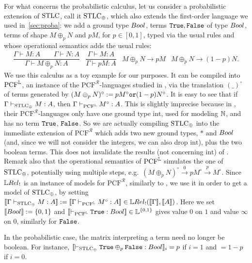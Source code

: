 For what concerns the probabilistic calculus, let us consider a probabilistic extension of $\mathrm{STLC}$, call it $\mathrm{STLC}_\oplus$, which also extends the first-order language we used in~\autoref{sec:proba}:
we add a ground type $\bool$, terms $\mathtt{True},\mathtt{False}$ of type $\bool$, terms of shape $M\oplus_p N$ and $pM$, for $p\in[0,1]$, typed via the usual rules and whose operational semantics adds the usual rules:
{\small{\[\begin{array}{cccc}
           \dfrac{\Gamma\vdash M:A \qquad \Gamma\vdash N:A}{\Gamma\vdash M\oplus_p N:A}
           &
           \dfrac{\Gamma\vdash M:A}{\Gamma\vdash pM:A}
           &
           M\oplus_p N \to pM
           &
           M\oplus_p N \to (1-p)N.
          \end{array}\]}}
We use this calculus as a toy example for our purposes.
It can be compiled into $\mathrm{PCF}^{\mathbb{L}}$, an instance of the $\mathrm{PCF}^{\mathcal R}$-languages studied in \cite{Manzo2013}, via the translation $(\_)^\circ$ of terms generated by $(M\oplus_p N)^\circ:=pM^\circ\mathtt{ or } (1-p)N^\circ$.
It is easy to see that if $\Gamma \vdash_{\mathrm{STLC}_\oplus} M:A$, then $\Gamma \vdash_{\mathrm{PCF}^{\mathbb{L}}} M^\circ:A$.
This is slightly imprecise because in \cite{Manzo2013}, their $\mathrm{PCF}^{\mathcal R}$-languages only have one ground type $\mathrm{int}$, used for modeling $\mathbb{N}$, and has no term $\mathtt{True}$, $\mathtt{False}$.
So we are actually compiling $\mathrm{STLC}_\oplus$ into the immediate extension of $\mathrm{PCF}^{\mathcal R}$ which adds two new ground types, $*$ and $\bool$ (and, since we will not consider the integers, we can also drop $\mathrm{int}$), plus the two boolean terms.
This does not invalidate the results (not concerning $\mathrm{int}$) of \cite{Manzo2013}.
Remark also that the operational semantics of $\mathrm{PCF}^{\mathbb{L}}$ \cite[Fig.\ 1]{Manzo2013} simulates the one of $\mathrm{STLC}_\oplus$, potentially using multiple steps, e.g.\ $(M\oplus_p N)^\circ \overset{0}{\rightarrow} pM^\circ \overset{p}{\rightarrow} M^\circ$.
Since $\LREL_!$ is an instance of models for $\mathrm{PCF}^{\mathcal{R}}$, similarly to \cite[Section VI]{Manzo2013}, we use it in order to get a model of $\mathrm{STLC}_\oplus$, by setting $\model{\Gamma \vdash_{\STLC_\oplus} M:A}:=\model{\Gamma \vdash_{\mathrm{PCF}^{\Lawv}} M^\circ:A}\in\HOM{\LREL_!}{\model{\Gamma}}{\model{A}}$.
Here we set $\model{\bool}:=\{0,1\}$ and $\model{\vdash_{\mathrm{PCF}^{\Lawv}} \true:\bool}\in\Lawv^{\{0,1\}}$ gives value $0$ on $1$ and value $\infty$ on $0$, similarly for $\mathtt{False}$.

\begin{remark}
 In the probabilistic case, the matrix interpreting a term need no longer be boolean.
 For instance, $\model{\vdash_{\STLC_\oplus} \true\oplus_p\false :\bool}_i=p$ if $i=1$ and $=1-p$ if $i=0$.
\end{remark}

